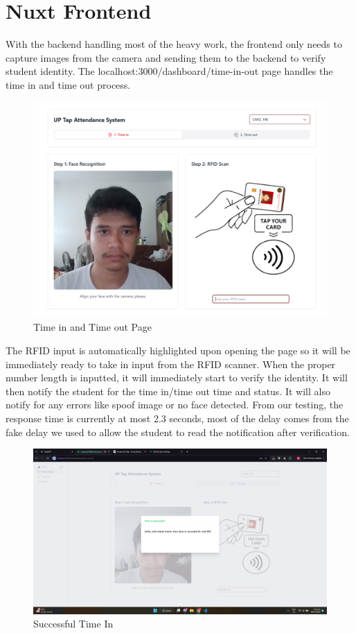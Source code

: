 \section{Nuxt Frontend}
With the backend handling most of the heavy work, the frontend only needs to capture images from the camera and sending them to the backend to verify student identity. The localhost:3000/dashboard/time-in-out page handles the time in and time out process.
\begin{figure}[h] %
	\centering
	\includegraphics[width=1.0\textwidth]{figures/chapter4/frontend.png} %
	\caption{Time in and Time out Page}
	\label{fig:frontend}
\end{figure}
The RFID input is automatically highlighted upon opening the page so it will be immediately ready to take in input from the RFID scanner. When the proper number length is inputted, it will immediately start to verify the identity. It will then notify the student for the time in/time out time and status. It will also notify for any errors like spoof image or no face detected. From our testing, the response time is currently at most 2.3 seconds, most of the delay comes from the fake delay we used to allow the student to read the notification after verification.
\begin{figure}[h] %
	\centering
	\includegraphics[width=1.0\textwidth]{figures/chapter4/success.png} %
	\caption{Successful Time In}
	\label{fig:success}
\end{figure}
